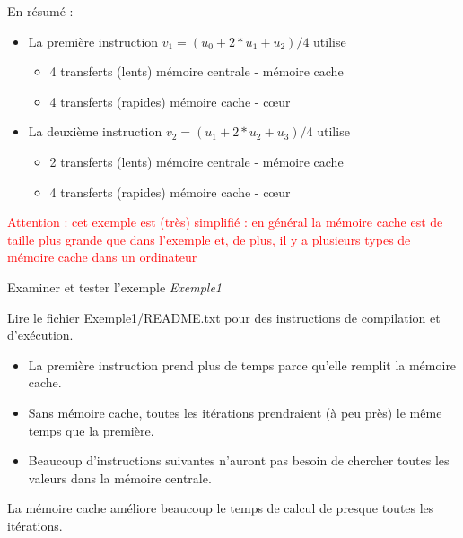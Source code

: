 \documentclass{beamer}
\begin{document}
\begin{frame}
	En résumé :
	\begin{itemize}
		\item La première instruction $v_1 = (u_0 + 2*u_1 + u_2)/4$ utilise
		\begin{itemize}
			\item 4 transferts (lents) mémoire centrale - mémoire cache
			\item 4 transferts (rapides)  mémoire cache - c\oe ur
		\end{itemize} 
	\smallskip
		\item La deuxième instruction $v_2 = (u_1 + 2*u_2 + u_3)/4$ utilise
		\begin{itemize}
			\item 2 transferts (lents) mémoire centrale - mémoire cache
			\item 4 transferts (rapides) mémoire cache - c\oe ur
		\end{itemize}
	\end{itemize}
\vfill
    \textcolor{red}{Attention : cet exemple est (très) simplifié : en général la mémoire cache est de taille plus grande que dans l'exemple et, de plus, il y a plusieurs types de mémoire cache dans un ordinateur}
\end{frame}

\begin{frame}
\vfill
Examiner et tester l'exemple {\it Exemple1}

Lire le fichier Exemple1/README.txt pour des instructions de compilation et d'exécution.
 
\vfill
\begin{itemize}
	\item La première instruction prend plus de temps parce qu'elle remplit la mémoire cache.
	\item Sans mémoire cache, toutes les itérations prendraient (à peu près) le même temps que la première.
	\item Beaucoup d'instructions suivantes n'auront pas besoin de chercher toutes les valeurs dans la mémoire centrale.
\end{itemize}    
    
\vfill
    La mémoire cache améliore beaucoup le temps de calcul de presque toutes les itérations.
    

\end{frame}
\end{document}
